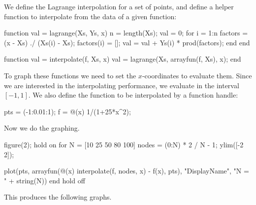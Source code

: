 \documentclass{homework}
\begin{document}
\begin{problem}
We define the Lagrange interpolation for a set of
points, and define a helper function to interpolate
from the data of a given function:
\begin{matlab}
function val = lagrange(Xs, Ys, x)
    n = length(Xs);
    val = 0;
    for i = 1:n
        factors = (x - Xs) ./ (Xs(i) - Xs);
        factors(i) = [];
        val = val + Ys(i) * prod(factors);
    end
end

function val = interpolate(f, Xs, x)
    val = lagrange(Xs, arrayfun(f, Xs), x);
end
\end{matlab}
To graph these functions we need to set the \(x\)-coordinates
to evaluate them. Since we are interested in the
interpolating performance, we evaluate in the
interval \([-1,1]\). We also define the function
to be interpolated by a function handle:
\begin{matlab}
pts = (-1:0.01:1);
f = @(x) 1/(1+25*x^2);
\end{matlab}
Now we do the graphing.
\begin{matlab}
figure(2);
hold on
for N = [10 25 50 80 100]
    nodes = (0:N) * 2 / N - 1;
    ylim([-2 2]);

    plot(pts, arrayfun(@(x) interpolate(f, nodes, x) - f(x), pts), "DisplayName", "N = " + string(N))
end
hold off
\end{matlab}
This produces the following graphs.


\end{problem}
\end{document}
